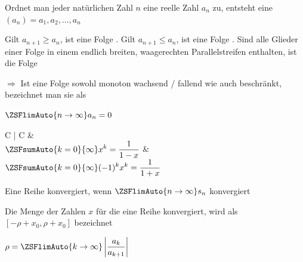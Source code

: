 
Ordnet man jeder natürlichen Zahl $n$ eine reelle Zahl $a_n$ zu, entsteht eine  $(a_n) = a_1, a_2, \dots, a_n$

Gilt $a_{n+1} \geq a_n$, ist eine Folge . Gilt $a_{n+1} \leq a_n$, ist eine Folge . Sind alle Glieder einer Folge in einem endlich breiten, waagerechten Parallelstreifen enthalten, ist die Folge 

$\Rightarrow$ Ist eine Folge sowohl monoton wachsend / fallend wie auch beschränkt, bezeichnet man sie als 

\begin{formulabox}
    $\displaystyle \ZSFlimAuto{n \to \infty} a_n = 0$
\end{formulabox}


\begin{fulltablebox}{C | C}
     &  \\ \hline
    \ZSFrowColor
        $\displaystyle \ZSFsumAuto{k=0}{\infty} x^k = \frac{1}{1-x}$ & $\displaystyle \ZSFsumAuto{k=0}{\infty} (-1)^k x^k = \frac{1}{1+x}$
\end{fulltablebox}

Eine Reihe konvergiert, wenn $\ZSFlimAuto{n \to \infty} s_n$ konvergiert

Die Menge der Zahlen $x$ für die eine Reihe konvergiert, wird als  $[-\rho+x_0, \rho+x_0]$ bezeichnet

\begin{formulabox}
    $\displaystyle \rho = \ZSFlimAuto{k \to \infty} \left| \frac{a_k}{a_{k+1}} \right|$
\end{formulabox}

